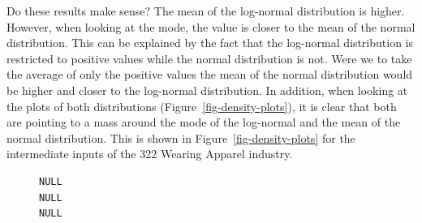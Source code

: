 \documentclass[
  12pt]{article}
\theoremstyle{definition}
\theoremstyle{remark}
\begin{document}
Do these results make sense? The mean of the log-normal distribution is
higher. However, when looking at the mode, the value is closer to the
mean of the normal distribution. This can be explained by the fact that
the log-normal distribution is restricted to positive values while the
normal distribution is not. Were we to take the average of only the
positive values the mean of the normal distribution would be higher and
closer to the log-normal distribution. In addition, when looking at the
plots of both distributions (Figure~\ref{fig-density-plots}), it is
clear that both are pointing to a mass around the mode of the log-normal
and the mean of the normal distribution. This is shown in
Figure~\ref{fig-density-plots} for the intermediate inputs of the 322
Wearing Apparel industry.

\begin{figure}

\begin{minipage}{\linewidth}

\begin{verbatim}
NULL
NULL
NULL
\end{verbatim}



\end{minipage}
\end{figure}
\end{document}

